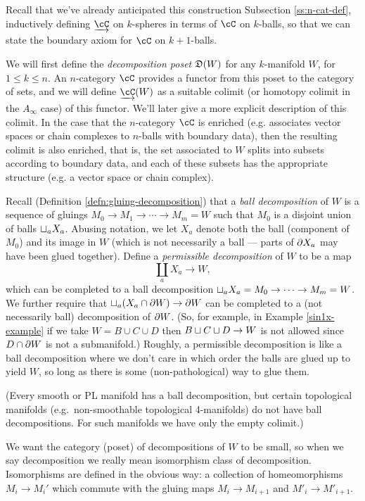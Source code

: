 Recall that we've already anticipated this construction Subsection \ref{ss:n-cat-def}, 
inductively defining $\cl{\cC}$ on $k$-spheres in terms of $\cC$ on $k$-balls, 
so that we can state the boundary axiom for $\cC$ on $k+1$-balls.

\medskip

We will first define the {\it decomposition poset} $\mathfrak{D}(W)$ for any $k$-manifold $W$, for $1 \leq k \leq n$. 
An $n$-category $\cC$ provides a functor from this poset to the category of sets, 
and we  will define $\cl{\cC}(W)$ as a suitable colimit 
(or homotopy colimit in the $A_\infty$ case) of this functor. 
We'll later give a more explicit description of this colimit.
In the case that the $n$-category $\cC$ is enriched (e.g. associates vector spaces or chain 
complexes to $n$-balls with boundary data), 
then the resulting colimit is also enriched, that is, the set associated to $W$ splits into 
subsets according to boundary data, and each of these subsets has the appropriate structure 
(e.g. a vector space or chain complex).

Recall (Definition \ref{defn:gluing-decomposition}) that a {\it ball decomposition} of $W$ is a 
sequence of gluings $M_0\to M_1\to\cdots\to M_m = W$ such that $M_0$ is a disjoint union of balls
$\sqcup_a X_a$.
Abusing notation, we let $X_a$ denote both the ball (component of $M_0$) and
its image in $W$ (which is not necessarily a ball --- parts of $\partial X_a$ may have been glued together).
Define a {\it permissible decomposition} of $W$ to be a map
\[
	\coprod_a X_a \to W,
\]
which can be completed to a ball decomposition $\sqcup_a X_a = M_0\to\cdots\to M_m = W$.
We further require that $\sqcup_a (X_a \cap \partial W) \to \partial W$ 
can be completed to a (not necessarily ball) decomposition of $\partial W$.
(So, for example, in Example \ref{sin1x-example} if we take $W = B\cup C\cup D$ then $B\sqcup C\sqcup D \to W$
is not allowed since $D\cap \partial W$ is not a submanifold.)
Roughly, a permissible decomposition is like a ball decomposition where we don't care in which order the balls
are glued up to yield $W$, so long as there is some (non-pathological) way to glue them.

(Every smooth or PL manifold has a ball decomposition, but certain topological manifolds (e.g.\ non-smoothable
topological 4-manifolds) do not have ball decompositions.
For such manifolds we have only the empty colimit.)

We want the category (poset) of decompositions of $W$ to be small, so when we say decomposition we really
mean isomorphism class of decomposition.
Isomorphisms are defined in the obvious way: a collection of homeomorphisms $M_i\to M_i'$ which commute
with the gluing maps $M_i\to M_{i+1}$ and $M'_i\to M'_{i+1}$.

